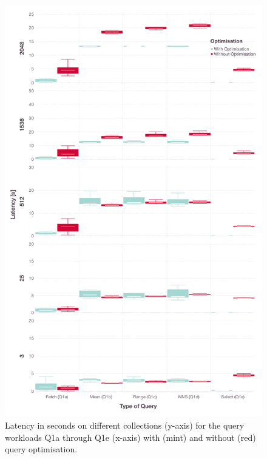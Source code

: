 \begin{figure}[p]
    \centering
    \includegraphics[width=\textwidth]{figures/analytics/analytics-cottontail-optimisation-runtime}
    \caption{Latency in seconds on different collections (y-axis) for the query workloads Q1a through Q1e (x-axis) with (mint) and without (red) query optimisation.}
    \label{figure:cottontail_analytics_optimisation}
\end{figure}


